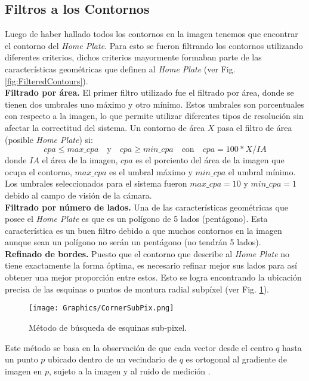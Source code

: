 \subsection{Filtros a los Contornos}

Luego de haber hallado todos los contornos en la imagen tenemos que encontrar el contorno del \textit{Home Plate}. Para esto se fueron filtrando los contornos utilizando diferentes criterios, dichos criterios mayormente formaban parte de las características geométricas que definen al \textit{Home Plate} (ver Fig. \ref{fig:FilteredContours}). \\

\textbf{Filtrado por área.}
El primer filtro utilizado fue el filtrado por área, donde se tienen dos umbrales uno máximo y otro mínimo. Estos umbrales son porcentuales con respecto a la imagen, lo que permite utilizar diferentes tipos de resolución sin afectar la correctitud del sistema. Un contorno de área $X$ pasa el filtro de área (posible \textit{Home Plate}) si:
$$cpa \leq max\_cpa \quad \text{y} \quad cpa \geq min\_cpa \quad \text{con} \quad cpa = 100 * X / IA$$
donde $IA$ el área de la imagen, $cpa$ es el porciento del área de la imagen que ocupa el contorno, $max\_cpa$ es el umbral máximo y $min\_cpa$ el umbral mínimo. Los umbrales seleccionados para el sistema fueron $max\_cpa = 10$ y $min\_cpa = 1$ debido al campo de visión de la cámara.\\

\textbf{Filtrado por número de lados.}
Una de las características geométricas que posee el \textit{Home Plate} es que es un polígono de 5 lados (pentágono). Esta característica es un buen filtro debido a que muchos contornos en la imagen aunque sean un polígono no serán un pentágono (no tendrán 5 lados).\\

\textbf{Refinado de bordes.}
Puesto que el contorno que describe al \textit{Home Plate} no tiene exactamente la forma óptima, es necesario refinar mejor sus lados para así obtener una mejor proporción entre estos. Esto se logra encontrando la ubicación precisa de las esquinas o puntos de montura radial subpíxel (ver Fig. \ref{fig:CornerSubPix}).

\begin{figure}[h!]
	\centering
	\texttt{[image: Graphics/CornerSubPix.png]}
	\caption{Método de búsqueda de esquinas sub-pixel.}
	\label{fig:CornerSubPix}
\end{figure}

Este método se basa en la observación de que cada vector desde el centro $q$ hasta un punto $p$ ubicado dentro de un vecindario de $q$ es ortogonal al gradiente de imagen en $p$, sujeto a la imagen y al ruido de medición \cite{CornerSubPixOpenCV}.\\

